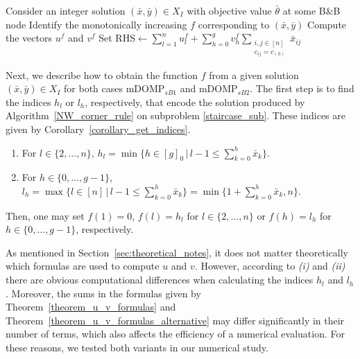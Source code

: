 \documentclass[letterpaper]{article}
\begin{document}
\begin{algorithm}[ht]
\caption{Benders cut separation for $\text{mDOMP}_{sB1}$ and $\text{mDOMP}_{sB2}$}\label{cut_separation_algo}
\DontPrintSemicolon
Consider an integer solution $(\bar{x}, \bar{y}) \in X_I$ with objective value $\bar{\theta}$ at some B\&B node\;
Identify the monotonically increasing $f$ corresponding to $(\bar{x}, \bar{y})$ \;
Compute the vectors $u^f$ and $v^f$ \;
Set $\mathrm{RHS} \leftarrow \sum_{l = 1}^n u^f_l + \sum_{h = 0}^g v^f_h \sum_{\substack{i,j \in [n] \\ c_{ij} = c_{(h)}}} \bar{x}_{ij}$\;
\end{algorithm}

Next, we describe how to obtain the function $f$ from a given solution $(\bar{x}, \bar{y}) \in X_I$ for both cases $\text{mDOMP}_{sB1}$ and $\text{mDOMP}_{sB2}$. The first step is to find the indices $h_l$ or $l_h$, respectively, that encode the solution produced by Algorithm~\ref{NW_corner_rule} on subproblem \eqref{staircase_sub}. These indices are given by Corollary~\ref{corollary_get_indices}.
\begin{enumerate}
    \item[\textit{(i)}] For $l \in \{2, \dots, n\}$, $h_l = \min \{ h \in [g]_0 \, | \, l-1 \leq \sum_{k = 0}^{h} \bar{x}_k \}$. 
    \item[\textit{(ii)}] For $h \in \{0, \dots, g-1\}$, $l_h = \max \{ l \in [n] \, | \, l-1 \leq \sum_{k = 0}^{h} \bar{x}_k \} = \min \{ 1 + \sum_{k = 0}^{h} \bar{x}_k, n \}$.
\end{enumerate}
Then, one may set $f(1) = 0$, $f(l) = h_l$ for $l \in \{2, \dots, n\}$ or $f(h) = l_h$ for $h \in \{0, \dots, g-1\}$, respectively.

As mentioned in Section~\ref{sec:theoretical_notes}, it does not matter theoretically which formulas are used to compute $u$ and $v$. However, according to \textit{(i)} and \textit{(ii)} there are obvious computational differences when calculating the indices $h_l$ and $l_h$. Moreover, the sums in the formulas given by Theorem~\ref{theorem_u_v_formulas} and Theorem~\ref{theorem_u_v_formulas_alternative} may differ significantly in their number of terms, which also affects the efficiency of a numerical evaluation. For these reasons, we tested both variants in our numerical study.
\end{document}
